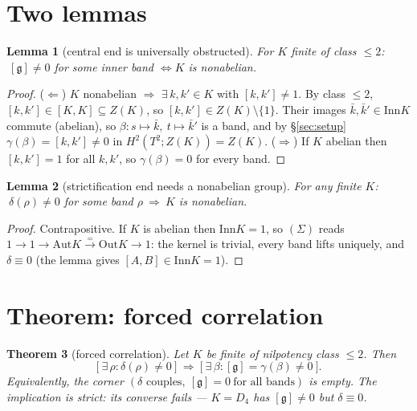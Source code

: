 \documentclass[11pt]{article}
\newtheorem{theorem}{Theorem}
\newtheorem{lemma}[theorem]{Lemma}
\theoremstyle{definition}
\newcommand{\Aut}{\mathrm{Aut}}
\newcommand{\Inn}{\mathrm{Inn}}
\newcommand{\Out}{\mathrm{Out}}
\newcommand{\gerbe}{\mathfrak{g}}
\begin{document}
\section{Two lemmas}\label{sec:lemmas}

\begin{lemma}[central end is universally obstructed]\label{lem:central}
For $K$ finite of class $\le2$: $\ [\gerbe]\neq0$ for some inner band $\iff K$ is nonabelian.
\end{lemma}

\begin{proof}
($\Leftarrow$) $K$ nonabelian $\Rightarrow$ $\exists\,k,k'\in K$ with $[k,k']\neq1$. By class
$\le2$, $[k,k']\in[K,K]\subseteq Z(K)$, so $[k,k']\in Z(K)\setminus\{1\}$. Their images
$\bar k,\bar k'\in\Inn K$ commute (abelian), so $\beta:s\mapsto\bar k,\ t\mapsto\bar k'$ is a
band, and by \S\ref{sec:setup} $\gamma(\beta)=[k,k']\neq0$ in $H^2(T^2;Z(K))=Z(K)$.
($\Rightarrow$) If $K$ abelian then $[k,k']=1$ for all $k,k'$, so $\gamma(\beta)=0$ for every
band.
\end{proof}

\begin{lemma}[strictification end needs a nonabelian group]\label{lem:strict}
For any finite $K$: $\ \delta(\rho)\neq0$ for some band $\rho\ \Rightarrow\ K$ is nonabelian.
\end{lemma}

\begin{proof}
Contrapositive. If $K$ is abelian then $\Inn K=1$, so $(\Sigma)$ reads
$1\to1\to\Aut K\xrightarrow{=}\Out K\to1$: the kernel is trivial, every band lifts uniquely, and
$\delta\equiv0$ (the lemma gives $[A,B]\in\Inn K=1$).
\end{proof}

\section{Theorem: forced correlation}\label{sec:theorem}

\begin{theorem}[forced correlation]\label{thm:main}
Let $K$ be finite of nilpotency class $\le2$. Then
\[
\big[\ \exists\,\rho:\delta(\rho)\neq0\ \big]\ \Longrightarrow\
\big[\ \exists\,\beta:[\gerbe]=\gamma(\beta)\neq0\ \big].
\]
Equivalently, the corner $(\delta\text{ couples},\ [\gerbe]=0\ \text{for all bands})$ is
\emph{empty}. The implication is \emph{strict}: its converse fails --- $K=D_4$ has
$[\gerbe]\neq0$ but $\delta\equiv0$.
\end{theorem}
\end{document}
